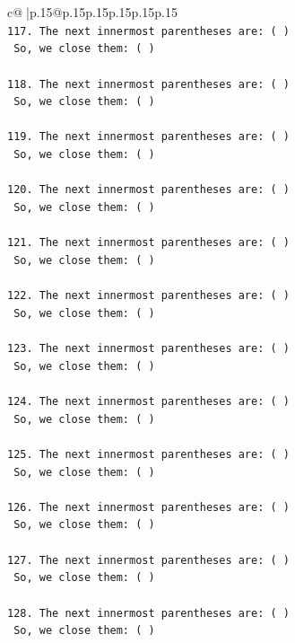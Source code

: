 \documentclass{article}
\begin{document}
{\begin{supertabular}{c@{$\;$}|p{.15\linewidth}@{}p{.15\linewidth}p{.15\linewidth}p{.15\linewidth}p{.15\linewidth}p{.15\linewidth}}
{{{\\ 
\texttt{117. The next innermost parentheses are: ( ) } \\
\texttt{    So, we close them: ( ) } \\
\\ 
\texttt{118. The next innermost parentheses are: ( ) } \\
\texttt{    So, we close them: ( ) } \\
\\ 
\texttt{119. The next innermost parentheses are: ( ) } \\
\texttt{    So, we close them: ( ) } \\
\\ 
\texttt{120. The next innermost parentheses are: ( ) } \\
\texttt{    So, we close them: ( ) } \\
\\ 
\texttt{121. The next innermost parentheses are: ( ) } \\
\texttt{    So, we close them: ( ) } \\
\\ 
\texttt{122. The next innermost parentheses are: ( ) } \\
\texttt{    So, we close them: ( ) } \\
\\ 
\texttt{123. The next innermost parentheses are: ( ) } \\
\texttt{    So, we close them: ( ) } \\
\\ 
\texttt{124. The next innermost parentheses are: ( ) } \\
\texttt{    So, we close them: ( ) } \\
\\ 
\texttt{125. The next innermost parentheses are: ( ) } \\
\texttt{    So, we close them: ( ) } \\
\\ 
\texttt{126. The next innermost parentheses are: ( ) } \\
\texttt{    So, we close them: ( ) } \\
\\ 
\texttt{127. The next innermost parentheses are: ( ) } \\
\texttt{    So, we close them: ( ) } \\
\\ 
\texttt{128. The next innermost parentheses are: ( ) } \\
\texttt{    So, we close them: ( ) } \\
}}}
\end{supertabular}}
\end{document}
